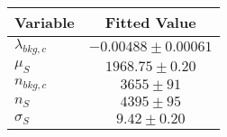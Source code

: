 \begin{tabular}[t]{lc}
\hline
Variable &Fitted Value\\
\hline\hline
$\lambda_{bkg,c}$&$-0.00488\pm0.00061$\\
\hline
$\mu_{S}$&$1968.75\pm0.20$\\
\hline
$n_{bkg,c}$&$3655\pm91$\\
\hline
$n_{S}$&$4395\pm95$\\
\hline
$\sigma_{S}$&$9.42\pm0.20$\\
\hline
\end{tabular}